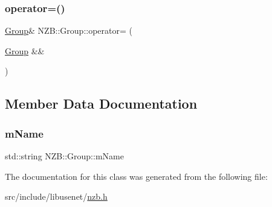 \hypertarget{class_n_z_b_1_1_group_a2b8221d52e4824ca8105a9d3488a5002}{}\label{class_n_z_b_1_1_group_a2b8221d52e4824ca8105a9d3488a5002} 
\subsubsection{\texorpdfstring{operator=()}{operator=()}\hspace{0.1cm}{\footnotesize\ttfamily [2/2]}}
{\footnotesize\ttfamily \hyperlink{class_n_z_b_1_1_group}{Group}\& N\+Z\+B\+::\+Group\+::operator= (\begin{DoxyParamCaption}\item[{\hyperlink{class_n_z_b_1_1_group}{Group} \&\&}]{ }\end{DoxyParamCaption})\hspace{0.3cm}{\ttfamily [default]}}



\subsection{Member Data Documentation}
\hypertarget{class_n_z_b_1_1_group_af721887690a5fef15739523486f36a59}{}\label{class_n_z_b_1_1_group_af721887690a5fef15739523486f36a59} 
\subsubsection{\texorpdfstring{m\+Name}{mName}}
{\footnotesize\ttfamily std\+::string N\+Z\+B\+::\+Group\+::m\+Name\hspace{0.3cm}{\ttfamily [protected]}}



The documentation for this class was generated from the following file\+:\begin{DoxyCompactItemize}
\item 
src/include/libusenet/\hyperlink{nzb_8h}{nzb.\+h}\end{DoxyCompactItemize}
